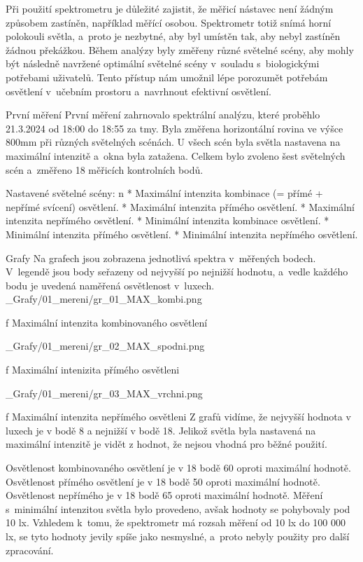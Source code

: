 Při použití spektrometru je důležité zajistit, že měřicí nástavec není žádným způsobem zastíněn,
například měřící osobou. Spektrometr totiž snímá horní polokouli světla, a~proto je nezbytné, aby byl umístěn tak, aby nebyl zastíněn žádnou překážkou.
\medskip
Během analýzy byly změřeny různé světelné scény, aby mohly být následně navržené optimální světelné scény
v~souladu s~biologickými potřebami uživatelů. Tento přístup nám umožnil lépe porozumět potřebám osvětlení
v~učebním prostoru a~navrhnout efektivní osvětlení.%

\sec První měření
První měření zahrnovalo spektrální analýzu, které proběhlo 21.3.2024 od 18:00 do 18:55 za tmy. Byla změřena horizontální rovina ve výšce 800mm
při různých světelných scénách. U všech scén byla světla nastavena na maximální intenzitě a~okna byla zatažena.
Celkem bylo zvoleno šest světelných scén a~změřeno 18 měřicích kontrolních bodů.
\medskip

{\sbf Nastavené světelné scény:}
\medskip
\begitems \style n
    * Maximální intenzita kombinace (= přímé + nepřímé svícení) osvětlení.
    * Maximální intenzita přímého osvětlení.
    * Maximální intenzita nepřímého osvětlení.
    * Minimální intenzita kombinace osvětlení.
    * Minimální intenzita přímého osvětlení.
    * Minimální intenzita nepřímého osvětlení.
\enditems

\secc Grafy
Na grafech jsou zobrazena jednotlivá spektra v~měřených bodech. V~legendě jsou body seřazeny od nejvyšší
po nejnižší hodnotu, a~vedle každého bodu je uvedená naměřená osvětlenost v~luxech.
\medskip {}
\picw=15cm _Grafy/01_mereni/gr_01_MAX_kombi.png
\caption/f Maximální intenzita kombinovaného osvětlení

\medskip {}
\picw=15cm _Grafy/01_mereni/gr_02_MAX_spodni.png
\caption/f Maximální intenizita přímého osvětleni

\medskip {}
\picw=15cm _Grafy/01_mereni/gr_03_MAX_vrchni.png
\caption/f Maximální intenzita nepřímého osvětleni
\medskip
Z grafů vidíme, že nejvyšší hodnota v luxech je v bodě 8 a nejnižší v bodě 18. Jelikož světla byla nastavená na maximální intenzitě
je vidět z hodnot, že nejsou vhodná pro běžné použití.

Osvětlenost kombinovaného osvětlení je v 18 bodě {60\pcent}  oproti maximální hodnotě.
Osvětlenost přímého osvětlení je v 18 bodě {50\pcent}  oproti maximální hodnotě.
Osvětlenost nepřímého je v 18 bodě {65\pcent}  oproti maximální hodnotě.
\medskip
Měření s~minimální intenzitou světla bylo provedeno, avšak hodnoty se pohybovaly pod 10 lx. Vzhledem k~tomu,
že spektrometr má rozsah měření od 10 lx do 100 000 lx, se tyto hodnoty jevily spíše jako nesmyslné, a~proto
nebyly použity pro další zpracování.

